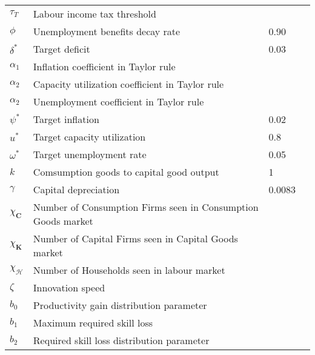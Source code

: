 \documentclass[a4paper, headings=standardclasses]{scrartcl}
\begin{document}
\begin{tabularx}{\linewidth}{lXll}
	$\tau_T$                     & Labour income tax threshold                                  &        &        \\
	$\phi$                       & Unemployment benefits decay rate                             & 0.90   &        \\
	$\delta^*$                   & Target deficit                                               & 0.03   &        \\
	$\alpha_1$                   & Inflation coefficient in Taylor rule                         &        &        \\
	$\alpha_2$                   & Capacity utilization coefficient in Taylor rule              &        &        \\
	$\alpha_2$                   & Unemployment coefficient in Taylor rule                      &        &        \\
	$\psi^*$                     & Target inflation                                             & 0.02   &        \\
	$u^*$                        & Target capacity utilization                                  & 0.8    &        \\
	$\omega^*$                   & Target unemployment rate                                     & 0.05   &        \\
	$k$                          & Comsumption goods to capital good output                     & 1      &        \\
	$\gamma$                     & Capital depreciation                                         & 0.0083 &        \\
	$\chi_\mathbf{C}$            & Number of Consumption Firms seen in Consumption Goods market &        &        \\
	$\chi_\mathbf{K}$            & Number of Capital Firms seen in Capital Goods market         &        &        \\
	$\chi_\mathcal{H}$           & Number of Households seen in labour market                   &        &        \\
	$\zeta$                      & Innovation speed                                             &        &        \\
	$b_0$                        & Productivity gain distribution parameter                     &        &        \\
	$b_1$                        & Maximum required skill loss                                  &        &        \\
	$b_2$                        & Required skill loss distribution parameter                   &        &        \\


	\bottomrule
\end{tabularx}
\end{document}
